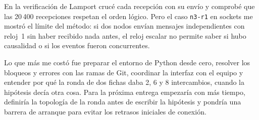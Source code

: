 En la verificación de Lamport crucé cada recepción con su envío y comprobé que las 20\,400 recepciones respetan el orden lógico. Pero el caso \texttt{n3-r1} en sockets me mostró el límite del método: si dos nodos envían mensajes independientes con reloj~1 sin haber recibido nada antes, el reloj escalar no permite saber si hubo causalidad o si los eventos fueron concurrentes.

Lo que más me costó fue preparar el entorno de Python desde cero, resolver los bloqueos y errores con las ramas de Git, coordinar la interfaz con el equipo y entender por qué la ronda de dos fichas daba 2, 6 y 8 intercambios, cuando la hipótesis decía otra cosa. Para la próxima entrega empezaría con más tiempo, definiría la topología de la ronda antes de escribir la hipótesis y pondría una barrera de arranque para evitar los retrasos iniciales de conexión.
